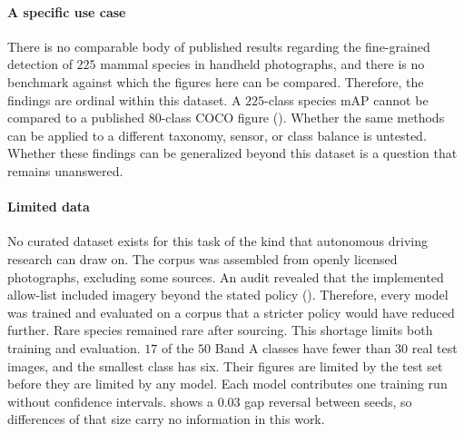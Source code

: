 \paragraph{A specific use case}
There is no comparable body of published results regarding the fine-grained detection of $225$ mammal species in handheld photographs, and there is no benchmark against which the figures here can be compared. Therefore, the findings are ordinal within this dataset. A $225$-class species mAP cannot be compared to a published $80$-class COCO figure (). Whether the same methods can be applied to a different taxonomy, sensor, or class balance is untested. Whether these findings can be generalized beyond this dataset is a question that remains unanswered.

\paragraph{Limited data}
No curated dataset exists for this task of the kind that autonomous driving research can draw on. The corpus was assembled from openly licensed photographs, excluding some sources. An audit revealed that the implemented allow-list included imagery beyond the stated policy (). Therefore, every model was trained and evaluated on a corpus that a stricter policy would have reduced further. Rare species remained rare after sourcing. This shortage limits both training and evaluation. $17$ of the $50$ Band A classes have fewer than $30$ real test images, and the smallest class has six. Their figures are limited by the test set before they are limited by any model. Each model contributes one training run without confidence intervals.  shows a $0.03$ gap reversal between seeds, so differences of that size carry no information in this work.

